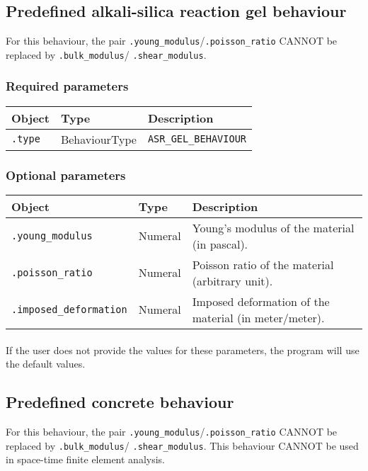 \documentclass[10pt]{article}
\begin{document}
\subsection{Predefined alkali-silica reaction gel behaviour}

For this behaviour, the pair \verb+.young_modulus+/\verb+.poisson_ratio+ CANNOT be replaced by \verb+.bulk_modulus+/ \verb+.shear_modulus+.

\subsubsection*{Required parameters}

\begin{tabularx}{\textwidth}{llX}
\hline 
Object & Type & Description \\ 
\hline 
\verb+.type+ & BehaviourType & \verb+ASR_GEL_BEHAVIOUR+ \\ 
\hline 
\end{tabularx}

\subsubsection*{Optional parameters}

\begin{tabularx}{\textwidth}{llX}
\hline 
Object & Type & Description \\ 
\hline 
\verb+.young_modulus+ & Numeral & Young's modulus of the material (in pascal). \\ 
\verb+.poisson_ratio+ & Numeral & Poisson ratio of the material (arbitrary unit). \\ 
\verb+.imposed_deformation+ & Numeral & Imposed deformation of the material (in meter/meter). \\ 
\hline 
\end{tabularx}

\paragraph{} If the user does not provide the values for these parameters, the program will use the default values.

\subsection{Predefined concrete behaviour}

For this behaviour, the pair \verb+.young_modulus+/\verb+.poisson_ratio+ CANNOT be replaced by \verb+.bulk_modulus+/ \verb+.shear_modulus+. This behaviour CANNOT be used in space-time finite element analysis.
\end{document}
